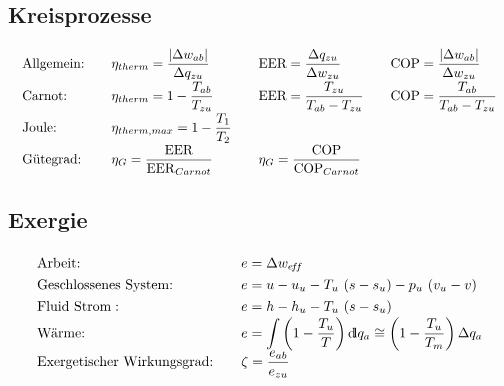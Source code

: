 \subsection{Kreisprozesse}
%
	\setlength{\abovedisplayshortskip}{-25pt}
	\[ \arraycolsep=1em \def\arraystretch{1.8}
		\begin{array}{llll}
			\text{Allgemein:} & \eta_{therm} = \dfrac{\abs{\Delta w_{ab}}} {\Delta q_{zu}} & \text{EER} = \dfrac{\Delta q_{zu}}{\Delta w_{zu}}    & \text{COP} = \dfrac{\abs{\Delta w_{ab}}}{\Delta w_{zu}} \\
			\text{Carnot:}    & \eta_{therm} = 1- \dfrac{T_{ab}}{T_{zu}}                   & \text{EER} = \dfrac{T_{zu}}{T_{ab} - T_{zu}}         & \text{COP} = \dfrac{T_{ab}}{T_{ab} - T_{zu}}            \\
			\text{Joule:}     & \eta_{therm,max} = 1 - \dfrac{T_1}{T_2}                    &                                                      &                                                         \\
			\text{Gütegrad:}  & \eta_G = \dfrac{\mathrm{EER}}{\mathrm{EER}_{Carnot}}       & \eta_G = \dfrac{\mathrm{COP}}{\mathrm{COP}_{Carnot}} &
		\end{array} \]

\subsection{Exergie}

	\hspace{3cm}
	\setlength{\abovedisplayshortskip}{-20pt}
	\[ \arraycolsep=1em \def\arraystretch{1.3}
		\begin{array}{ll}
			\text{Arbeit:}                     & e = \Delta w_{\eff}                                                                                             \\
			\text{Geschlossenes System:}       & e = u - u_u - T_u\ (s-s_u) - p_u\ (v_u-v)                                                                       \\
			\text{Fluid Strom}:                & e = h - h_u - T_u\ (s-s_u)                                                                                      \\
			\text{Wärme:}                      & e = \mathlarger{\int} \left(1-\dfrac{T_u}{T} \right) \dd q_a  \cong \left(1-\dfrac{T_u}{T_m} \right) \Delta q_a \\
			\text{Exergetischer Wirkungsgrad:} & \zeta = \dfrac{e_{ab}}{e_{zu}}
		\end{array} \]
